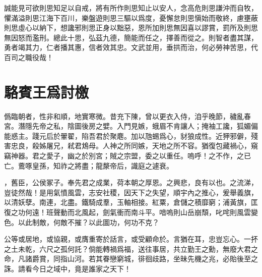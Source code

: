 誠能見可欲則思知足以自戒，將有所作則思知止以安人，念高危則思謙沖而自牧，懼滿溢則思江海下百川，樂盤遊則思三驅以爲度，憂懈怠則思愼始而敬終，慮壅蔽則思虛心以納下，想讒邪則思正身以黜惡，恩所加則思無因喜以謬賞，罰所及則思無因怒而濫刑。總此十思，弘茲九德，簡能而任之，擇善而從之。則智者盡其謀，勇者竭其力，仁者播其惠，信者效其忠。文武並用，垂拱而治，何必勞神苦思，代百司之職役哉！

\theendnotes

\section[爲徐敬業討武曌檄\quad{\small 駱賓王}]{{\normalsize 駱賓王}\quad 爲討檄}
僞臨朝者，性非和順，地實寒微。昔充下陳，曾以更衣入侍，洎乎晚節，穢亂春宮。潛隱先帝之私，陰圖後房之嬖。入門見嫉，蛾眉不肯讓人；掩袖工讒，狐媚偏能惑主。踐元后於翬翟，陷吾君於聚麀。加以虺蜴爲心，豺狼成性。近狎邪僻，殘害忠良，殺姊屠兄，弒君鴆母。人神之所同嫉，天地之所不容。猶復包藏禍心，窺竊神器。君之愛子，幽之於別宮；賊之宗盟，委之以重任。嗚呼！之不作，之已亡。鷰啄皇孫，知祚之將盡；龍漦帝后，識庭之遽衰。

，舊臣，公侯冢子。奉先君之成業，荷本朝之厚恩。之興悲，良有以也。之流涕，豈徒然哉！是用氣憤風雲，志安社稷，因天下之失望，順宇內之推心，爰舉義旗，以清妖孽。南連，北盡。鐵騎成羣，玉軸相接。紅粟，倉儲之積靡窮；浦黃旗，匡復之功何遠！班聲動而北風起，劍氣衝而南斗平。喑嗚則山岳崩頹，叱咤則風雲變色。以此制敵，何敵不摧？以此圖功，何功不克？

公等或居地，或協親，或膺重寄於話言，或受顧命於。言猶在耳，忠豈忘心。一抔之土未乾，六尺之孤何託？倘能轉禍爲福，送往事居，共立勤王之勳，無廢大君之命，凡諸爵賞，同指山河。若其眷戀窮城，徘徊歧路，坐昧先機之兆，必貽後至之誅。請看今日之域中，竟是誰家之天下！ 

